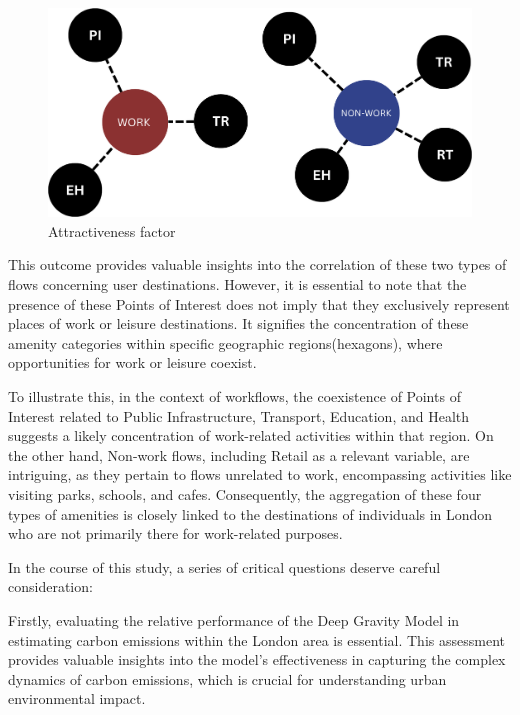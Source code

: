         \begin{figure}[H]
            \centering
            \includegraphics[width=14cm]{Images/Atractiveness factor.png}
            \caption{Attractiveness factor}
            \label{fig: Attractiveness factor}
        \end{figure}

        This outcome provides valuable insights into the correlation of these two types of flows concerning user destinations. However, it is essential to note that the presence of these Points of Interest does not imply that they exclusively represent places of work or leisure destinations. It signifies the concentration of these amenity categories within specific geographic regions(hexagons), where opportunities for work or leisure coexist.

        To illustrate this, in the context of workflows, the coexistence of Points of Interest related to Public Infrastructure, Transport, Education, and Health suggests a likely concentration of work-related activities within that region. On the other hand, Non-work flows, including Retail as a relevant variable, are intriguing, as they pertain to flows unrelated to work, encompassing activities like visiting parks, schools, and cafes. Consequently, the aggregation of these four types of amenities is closely linked to the destinations of individuals in London who are not primarily there for work-related purposes.
        
        In the course of this study, a series of critical questions deserve careful consideration:
        
        Firstly, evaluating the relative performance of the Deep Gravity Model in estimating carbon emissions within the London area is essential. This assessment provides valuable insights into the model's effectiveness in capturing the complex dynamics of carbon emissions, which is crucial for understanding urban environmental impact.
        
